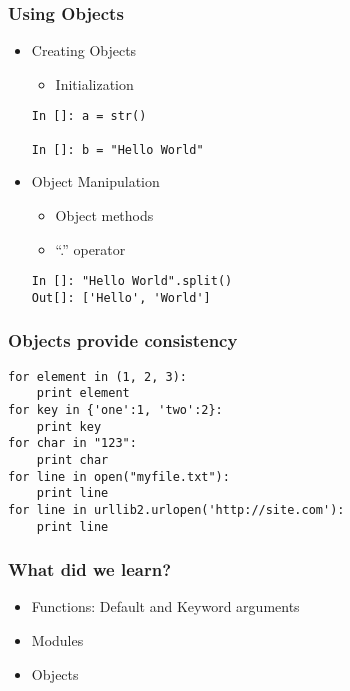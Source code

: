 \documentclass[14pt,compress]{beamer}
\newcounter{time}
\newcommand{\inctime}[1]{\addtocounter{time}{#1}{\tiny \thetime\ m}}
\begin{document}
\begin{frame}[fragile]
\frametitle{Using Objects}
  \begin{itemize}
    \item Creating Objects
    \begin{itemize}
      \item Initialization
    \end{itemize}
    \begin{lstlisting}
In []: a = str()

In []: b = "Hello World"
    \end{lstlisting}
    \item Object Manipulation
    \begin{itemize}
      \item Object methods
      \item ``.'' operator
    \end{itemize}
  \begin{lstlisting}
In []: "Hello World".split()
Out[]: ['Hello', 'World']
    \end{lstlisting}
  \end{itemize}
\end{frame}

\begin{frame}[fragile]
  \frametitle{Objects provide consistency}
  \small
  \begin{lstlisting}
for element in (1, 2, 3):
    print element
for key in {'one':1, 'two':2}:
    print key
for char in "123":
    print char
for line in open("myfile.txt"):
    print line
for line in urllib2.urlopen('http://site.com'):
    print line
  \end{lstlisting}
  \inctime{10}
\end{frame}

\begin{frame}
  \frametitle{What did we learn?}
  \begin{itemize}
    \item Functions: Default and Keyword arguments
    \item Modules
    \item Objects
  \end{itemize}
\end{frame}
\end{document}
